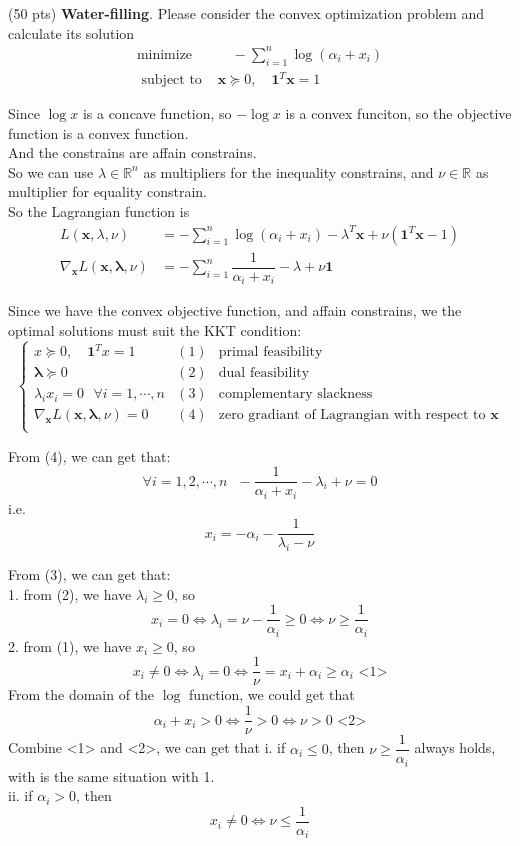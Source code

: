 \item {\color{red} (50 pts)} \textbf{Water-filling}. Please consider the convex optimization problem and calculate its solution
$$
\begin{aligned}
\text {minimize \ \ \ \ \ } & \quad-\sum_{i=1}^n \log \left(\alpha_i+x_i\right) \\
\text { subject to \ \ \ \ \ } & \mathbf{x} \succeq 0, \quad \mathbf{1}^T \mathbf{x}=1
\end{aligned}
$$

\solution{}
Since $\log x$ is a concave function, so $-\log x$ is a convex funciton, so the objective function is a convex function.\\
And the constrains are affain constrains.\\
So we can use $\lambda\in\mathbb{R}^n$ as multipliers for the inequality constrains, and $\nu\in\mathbb{R}$ as multiplier for equality constrain.\\
So the Lagrangian function is
\begin{align*}
    L(\mathbf{x},\lambda, \nu) &= -\sum_{i=1}^n\log(\alpha_i+x_i)-\lambda^T\mathbf{x}+\nu(\mathbf{1}^T\mathbf{x}-1)\\
    \nabla_{\mathbf{x}} L(\mathbf{x},\mathbf{\lambda},\nu) &=-\sum_{i=1}^n\dfrac{1}{\alpha_i+x_i}-\lambda+\nu\mathbf{1}
\end{align*}

Since we have the convex objective function, and affain constrains, we the optimal solutions must suit the KKT condition:
$$
\left\{\begin{array}{ccc}
x \succeq 0, \quad \mathbf{1}^T x=1 & (1) & \text{primal feasibility} \\
\mathbf{\lambda} \succeq 0 & (2) & \text{dual feasibility} \\
\lambda_ix_i=0  \ \ \ \forall i=1,\cdots,n & (3) & \text{complementary slackness} \\
\nabla_{\mathbf{x}} L(\mathbf{x},\mathbf{\lambda},\nu)=0 & (4) & \text{zero gradiant of Lagrangian with respect to }\mathbf{x} \\
\end{array}\right.
$$

From (4), we can get that:
$$\forall i=1,2,\cdots,n\ \ \ -\dfrac{1}{\alpha_i+x_i}-\lambda_i+\nu=0$$
i.e. $$x_i=-\alpha_i-\dfrac{1}{\lambda_i-\nu}$$

From (3), we can get that:\\
1. from (2), we have $\lambda_i\geq 0$, so
$$x_i=0 \Leftrightarrow \lambda_i=\nu-\dfrac{1}{\alpha_i} \geq 0 \Leftrightarrow \nu\geq\dfrac{1}{\alpha_i}$$
2. from (1), we have $x_i\geq 0$, so
$$x_i\neq 0 \Leftrightarrow \lambda_i=0 \Leftrightarrow \dfrac{1}{\nu}=x_i+\alpha_i\geq \alpha_i \text{\ \ \ \ \ \ <1>}$$
From the domain of the $\log$ function, we could get that 
$$\alpha_i+x_i>0 \Leftrightarrow \dfrac{1}{\nu} > 0 \Leftrightarrow \nu > 0 \text{\ \ \ \ \ \ \ \ \ \ \ \ \ <2>}$$
Combine <1> and <2>, we can get that 
i. if $\alpha_i\leq 0$, then $\nu\geq\dfrac{1}{\alpha_i}$ always holds, with is the same situation with 1.\\
ii. if $\alpha_i>0$, then
$$x_i\neq 0 \Leftrightarrow \nu\leq\dfrac{1}{\alpha_i}$$

